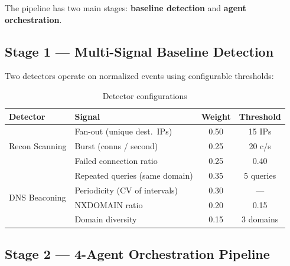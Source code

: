 \documentclass[11pt, a4paper]{article}
\begin{document}
The pipeline has two main stages: \textbf{baseline detection} and \textbf{agent orchestration}.

\subsection{Stage 1 --- Multi-Signal Baseline Detection}

Two detectors operate on normalized events using configurable thresholds:

\begin{table}[H]
\centering\small
\caption{Detector configurations}
\label{tab:detectors}
\begin{tabular}{@{} l l c c @{}}
\toprule
\textbf{Detector} & \textbf{Signal} & \textbf{Weight} & \textbf{Threshold} \\
\midrule
\multirow{3}{*}{Recon Scanning}
  & Fan-out (unique dest.\ IPs)      & 0.50 & 15 IPs \\
  & Burst (conns / second)            & 0.25 & 20 c/s \\
  & Failed connection ratio            & 0.25 & 0.40 \\
\midrule
\multirow{4}{*}{DNS Beaconing}
  & Repeated queries (same domain)     & 0.35 & 5 queries \\
  & Periodicity (CV of intervals)      & 0.30 & --- \\
  & NXDOMAIN ratio                     & 0.20 & 0.15 \\
  & Domain diversity                   & 0.15 & 3 domains \\
\bottomrule
\end{tabular}
\end{table}

\subsection{Stage 2 --- 4-Agent Orchestration Pipeline}
\end{document}
